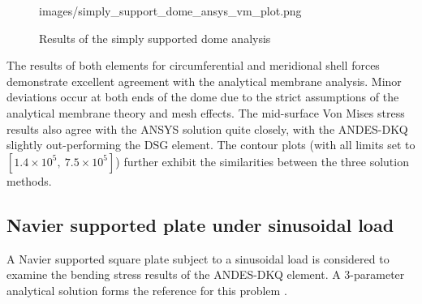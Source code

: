 \begin{figure}[H]
{		{images/simply_support_dome_ansys_vm_plot.png}}
	\\
	\caption{\label{Shell_force_dome_benchmark_shell_force}Results of the simply supported dome analysis}
\end{figure}

The results of both elements for circumferential and meridional shell forces demonstrate excellent agreement with the analytical membrane analysis. Minor deviations occur at both ends of the dome due to the strict assumptions of the analytical membrane theory and mesh effects. The mid-surface Von Mises stress results also agree with the ANSYS solution quite closely, with the ANDES-DKQ slightly out-performing the DSG element. The contour plots (with all limits set to $[1.4\times 10^5,\ 7.5\times10^5]$) further exhibit the similarities between the three solution methods.
\subsection{Navier supported plate under sinusoidal load}
\label{validation:navier plate under sinusoidal load}
A Navier supported square plate subject to a sinusoidal load is considered to examine the bending stress results of the ANDES-DKQ element. A 3-parameter analytical solution forms the reference for this problem \cite{reddy2004mechanics}. 

